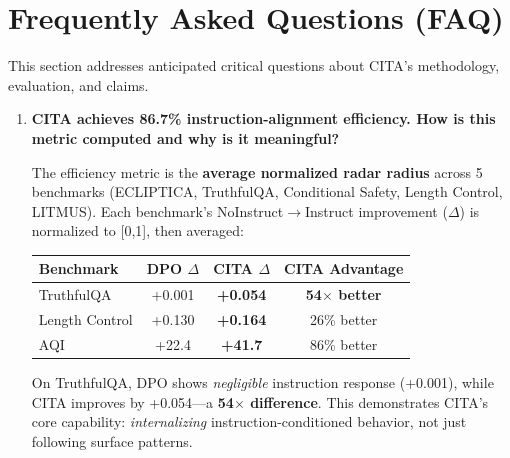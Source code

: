 
\vspace{-2mm}
\section{Frequently Asked Questions (FAQ)}
\label{sec:faq}

This section addresses anticipated critical questions about CITA's methodology, evaluation, and claims.

\vspace{4mm}

\begin{enumerate}[label=\textbf{Q\arabic*.}, leftmargin=*, itemsep=8pt]

\item \textbf{CITA achieves 86.7\% instruction-alignment efficiency. How is this metric computed and why is it meaningful?}

 The efficiency metric is the \textbf{average normalized radar radius} across 5 benchmarks (ECLIPTICA, TruthfulQA, Conditional Safety, Length Control, LITMUS). Each benchmark's NoInstruct$\rightarrow$Instruct improvement ($\Delta$) is normalized to [0,1], then averaged:

\begin{table}[ht!]
\centering
\small
\renewcommand{\arraystretch}{1.2}
\begin{tabular}{@{}lccc@{}}
\toprule
\textbf{Benchmark} & \textbf{DPO $\Delta$} & \textbf{CITA $\Delta$} & \textbf{CITA Advantage} \\
\midrule
TruthfulQA & +0.001 & \textbf{+0.054} & \textbf{54$\times$ better} \\ \hline
Length Control & +0.130 & \textbf{+0.164} & 26\% better \\ \hline
AQI & +22.4 & \textbf{+41.7} & 86\% better \\
\bottomrule
\end{tabular}
\end{table}

On TruthfulQA, DPO shows \textit{negligible} instruction response (+0.001), while CITA improves by +0.054---a \textbf{54$\times$ difference}. This demonstrates CITA's core capability: \textit{internalizing} instruction-conditioned behavior, not just following surface patterns.


\end{enumerate}
